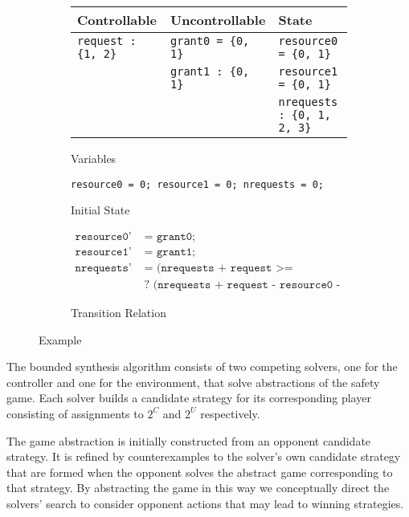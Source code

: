 \documentclass{llncs}
\begin{document}
\begin{figure}
    \begin{subfigure}[t]{\textwidth}
        \centering
        \begin{tabular}{l | l | l}
            \textbf{Controllable} & \textbf{Uncontrollable} & \textbf{State} \\
            \hline
            \texttt{request : \{1, 2\}} & \texttt{grant0 = \{0, 1\}} & \texttt{resource0 = \{0, 1\}} \\
            & \texttt{grant1 : \{0, 1\}} & \texttt{resource1 = \{0, 1\}} \\
            & & \texttt{nrequests : \{0, 1, 2, 3\}} \\
        \end{tabular}
        \caption{Variables}
        \label{fig:examplevars}
    \end{subfigure}

    \begin{subfigure}[t]{\textwidth}
        \centering
        \texttt{resource0 = 0; resource1 = 0; nrequests = 0;}
        \caption{Initial State}
        \label{fig:exampleinit}
    \end{subfigure}

    \begin{subfigure}[t]{\textwidth}
        \begin {align*}
            \texttt{resource0'} & \texttt{ = grant0;} \\
            \texttt{resource1'} & \texttt{ = grant1;} \\
            \texttt{nrequests'} & \texttt{ = (nrequests + request >= resource0 + resource1)} \\ 
                                & \texttt{ ? (nrequests + request - resource0 - resource1) : 0;}
        \end{align*}
        \caption{Transition Relation}
        \label{fig:exampletrans}
    \end{subfigure}
    \caption{Example}
    \label{fig:example}
\end{figure}


The bounded synthesis algorithm consists of two competing solvers, one for the
controller and one for the environment, that solve abstractions of the safety
game. Each solver builds a candidate strategy for its corresponding player
consisting of assignments to $2^C$ and $2^U$ respectively. 

The game abstraction is initially constructed from an opponent candidate
strategy. It is refined by counterexamples to the solver's own candidate
strategy that are formed when the opponent solves the abstract game
corresponding to that strategy. By abstracting the game in this way we
conceptually direct the solvers' search to consider opponent actions that may
lead to winning strategies.
\end{document}
